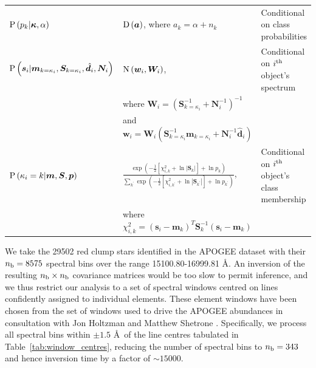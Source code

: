 \documentclass[a4paper,fleqn,usenatbib]{mnras}
\newcommand{\nb}{n_{\rm b}}
\newcommand{\prob}{{\rm P}}
\newcommand{\normal}{{\rm{N}}}
\newcommand{\dirichlet}{{\rm D}}
\newcommand{\alphas}{{\bm a}}
\newcommand{\specmean}{{\bm m}}
\newcommand{\speccov}{{\bm S}}
\newcommand{\classprob}{{p}}
\newcommand{\classprobs}{{\bm p}}
\newcommand{\objspec}{{\bm s}}
\newcommand{\objclass}{{\kappa}}
\newcommand{\objclasses}{{\bm \kappa}}
\newcommand{\objdata}{\hat{\bm d}}
\newcommand{\objnoise}{{\bm N}}
\newcommand{\wfmean}{{\bm w}}
\newcommand{\wfcov}{{\bm W}}
\begin{document}
\begin{table}
\begin{tabular}{lll}
        $\prob\left(\classprob_k | \objclasses, \alpha\right)$ & $\dirichlet\left(\alphas\right)$, where $a_k = \alpha + n_k$ & Conditional on class probabilities \\
        $\prob \left( \objspec_i | \specmean_{k=\objclass_i}, \speccov_{k=\objclass_i}, \objdata_i, \objnoise_i \right)$ & $\normal \left( \wfmean_i, \wfcov_i \right)$, & Conditional on $i^{\rm th}$ object's spectrum \\
         & where $\wfcov_i = \left( \speccov_{k=\objclass_i}^{-1} + \objnoise_i^{-1} \right)^{-1}$ &  \\
         & and $\wfmean_i = \wfcov_i \left( \speccov_{k=\objclass_i}^{-1} \specmean_{k=\objclass_i} + \objnoise_i^{-1} \objdata_i \right)$ &  \\
        $\prob \left( \objclass_i = k | \specmean, \speccov, \classprobs \right)$ & $ \frac{ \exp \left( -\frac{1}{2} \left[ \chi^2_{i,k} + \ln \left| \speccov_k \right| \right] + \ln \classprob_k \right) }{ \sum_{k^\prime} \exp \left( -\frac{1}{2} \left[ \chi^2_{i,k^\prime} + \ln \left| \speccov_{k^\prime} \right| \right] + \ln \classprob_{k^\prime} \right) }$, & Conditional on $i^{\rm th}$ object's class membership \\
         & where $\chi^2_{i,k} = \left( \objspec_i - \specmean_k \right)^T \speccov_k^{-1} \left( \objspec_i - \specmean_k \right) $ &  \\
        \hline
    \end{tabular}
\end{table}


We take the 29502 red clump stars identified in the APOGEE dataset with their $\nb = 8575$ spectral bins over the range 15100.80-16999.81 \AA. An inversion of the resulting $\nb \times \nb$ covariance matrices would be too slow to permit inference, and we thus restrict our analysis to a set of spectral windows centred on lines confidently assigned to individual elements. These element windows have been chosen from the set of windows used to drive the APOGEE abundances in consultation with Jon Holtzman and Matthew Shetrone \citep{Holtzman2015, Shetrone2015}. Specifically, we process all spectral bins within $\pm 1.5$ \AA\ of the line centres tabulated in Table~\ref{tab:window_centres}, reducing the number of spectral bins to $\nb = 343$ and hence inversion time by a factor of $\sim15000$. %
\end{document}
